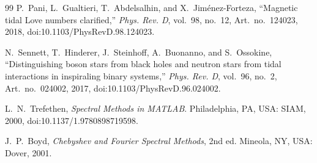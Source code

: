 \documentclass[aps,prd,preprint,onecolumn,nofootinbib,superscriptaddress,showkeys]{revtex4-2}
\begin{document}
\begin{thebibliography}{99}
P.~Pani, L.~Gualtieri, T.~Abdelsalhin, and X.~Jim\'enez-Forteza,
``Magnetic tidal Love numbers clarified,''
\emph{Phys. Rev. D}, vol.~98, no.~12, Art.~no.~124023, 2018,
doi:10.1103/PhysRevD.98.124023.

N.~Sennett, T.~Hinderer, J.~Steinhoff, A.~Buonanno, and S.~Ossokine,
``Distinguishing boson stars from black holes and neutron stars from tidal interactions in inspiraling binary systems,''
\emph{Phys. Rev. D}, vol.~96, no.~2, Art.~no.~024002, 2017,
doi:10.1103/PhysRevD.96.024002.

L.~N.~Trefethen,
\emph{Spectral Methods in MATLAB}.
Philadelphia, PA, USA: SIAM, 2000,
doi:10.1137/1.9780898719598.

J.~P.~Boyd,
\emph{Chebyshev and Fourier Spectral Methods}, 2nd ed.
Mineola, NY, USA: Dover, 2001.

\end{thebibliography}
\end{document}
